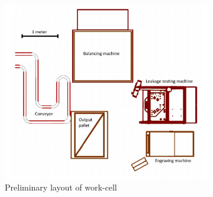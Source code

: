 \begin{figure}[h!]
\begin{subfigure}{.49\textwidth}
    \includegraphics[width=\textwidth]{TechnicalAnlysis/layout.PNG}
    \caption{Preliminary layout of work-cell\cite{Case}}
    \label{fig:Layoutworkcell} 
    \end{subfigure}
    \caption{}
\end{figure}


\newpage

